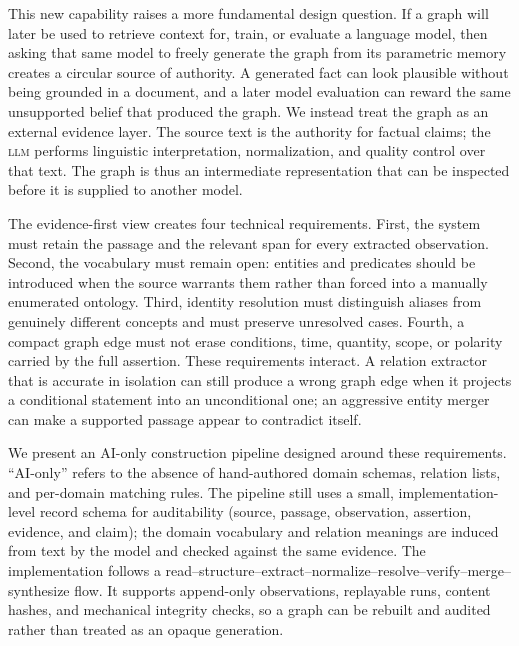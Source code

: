 \documentclass[11pt]{article}
\newcommand{\llm}{\textsc{llm}}
\begin{document}
This new capability raises a more fundamental design question. If a graph will later be used to retrieve context for, train, or evaluate a language model, then asking that same model to freely generate the graph from its parametric memory creates a circular source of authority. A generated fact can look plausible without being grounded in a document, and a later model evaluation can reward the same unsupported belief that produced the graph. We instead treat the graph as an external evidence layer. The source text is the authority for factual claims; the \llm{} performs linguistic interpretation, normalization, and quality control over that text. The graph is thus an intermediate representation that can be inspected before it is supplied to another model.

The evidence-first view creates four technical requirements. First, the system must retain the passage and the relevant span for every extracted observation. Second, the vocabulary must remain open: entities and predicates should be introduced when the source warrants them rather than forced into a manually enumerated ontology. Third, identity resolution must distinguish aliases from genuinely different concepts and must preserve unresolved cases. Fourth, a compact graph edge must not erase conditions, time, quantity, scope, or polarity carried by the full assertion. These requirements interact. A relation extractor that is accurate in isolation can still produce a wrong graph edge when it projects a conditional statement into an unconditional one; an aggressive entity merger can make a supported passage appear to contradict itself.

We present an AI-only construction pipeline designed around these requirements. ``AI-only'' refers to the absence of hand-authored domain schemas, relation lists, and per-domain matching rules. The pipeline still uses a small, implementation-level record schema for auditability (source, passage, observation, assertion, evidence, and claim); the domain vocabulary and relation meanings are induced from text by the model and checked against the same evidence. The implementation follows a read--structure--extract--normalize--resolve--verify--merge--synthesize flow. It supports append-only observations, replayable runs, content hashes, and mechanical integrity checks, so a graph can be rebuilt and audited rather than treated as an opaque generation.
\end{document}
